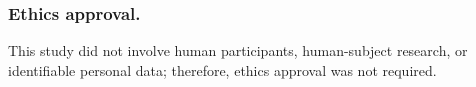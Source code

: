 \begin{credits}
\subsubsection{Ethics approval.}
This study did not involve human participants, human-subject research, or
identifiable personal data; therefore, ethics approval was not required.
\end{credits}
